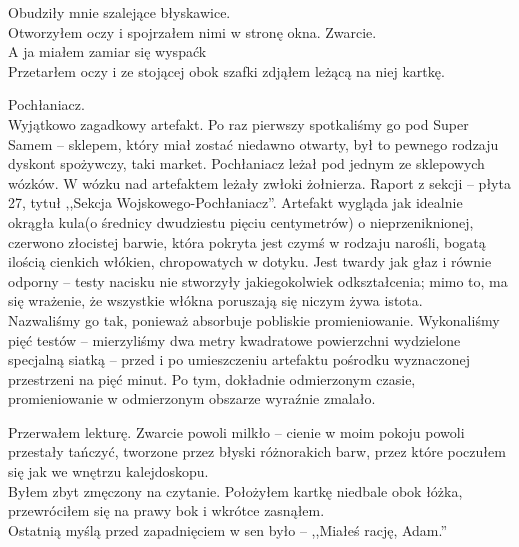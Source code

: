 \documentclass[../MAIN.tex]{subfiles}
\begin{document}
Obudziły mnie szalejące błyskawice.\\
Otworzyłem oczy i spojrzałem nimi w stronę okna. Zwarcie.\\
A ja miałem zamiar się wyspać\3k\\
Przetarłem oczy i ze stojącej obok szafki zdjąłem leżącą na niej kartkę.

Pochłaniacz.\\
Wyjątkowo zagadkowy artefakt. Po raz pierwszy spotkaliśmy go pod Super Samem -- sklepem, który miał zostać niedawno otwarty, był to pewnego rodzaju dyskont spożywczy, taki market. Pochłaniacz leżał pod jednym ze sklepowych wózków. W wózku nad artefaktem leżały zwłoki żołnierza. Raport z sekcji -- płyta 27, tytuł ,,Sekcja Wojskowego-Pochłaniacz''.
Artefakt wygląda jak idealnie okrągła kula(o średnicy dwudziestu pięciu centymetrów) o nieprzeniknionej, czerwono złocistej barwie, która pokryta jest czymś w rodzaju narośli, bogatą ilością cienkich włókien, chropowatych w dotyku. Jest twardy jak głaz i równie odporny -- testy nacisku nie stworzyły jakiegokolwiek odkształcenia; mimo to, ma się wrażenie, że wszystkie włókna poruszają się niczym żywa istota.\\
Nazwaliśmy go tak, ponieważ absorbuje pobliskie promieniowanie. Wykonaliśmy pięć testów -- mierzyliśmy dwa metry kwadratowe powierzchni wydzielone specjalną siatką -- przed i po umieszczeniu artefaktu pośrodku wyznaczonej przestrzeni na pięć minut. Po tym, dokładnie odmierzonym czasie, promieniowanie w odmierzonym obszarze wyraźnie zmalało.

Przerwałem lekturę. Zwarcie powoli milkło -- cienie w moim pokoju powoli przestały tańczyć, tworzone przez błyski różnorakich barw, przez które poczułem się jak we wnętrzu kalejdoskopu.\\
Byłem zbyt zmęczony na czytanie. Położyłem kartkę niedbale obok łóżka, przewróciłem się na prawy bok i wkrótce zasnąłem.\\
Ostatnią myślą przed zapadnięciem w sen było -- ,,Miałeś rację, Adam.''
\end{document}
